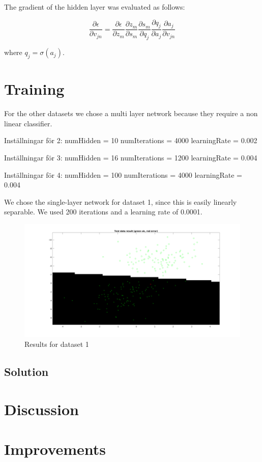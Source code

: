 \documentclass{article}
\begin{document}
The gradient of the hidden layer was evaluated as follows:

\begin{equation}
  \frac{\partial \epsilon}{\partial v_{jn}} =
  \frac{\partial \epsilon}{\partial z_m}
  \frac{\partial z_m}{\partial s_m}
  \frac{\partial s_m}{\partial q_j}
  \frac{\partial q_j}{\partial a_j}
  \frac{\partial a_j}{\partial v_{jn}}
\end{equation}

where $q_j = \sigma(a_j)$.

\section{Training}

For the other datasets we chose a multi layer network because they
require a non linear classifier.

Inställningar för 2:
numHidden = 10
numIterations = 4000
learningRate = 0.002

Inställningar för 3:
numHidden = 16
numIterations = 1200
learningRate = 0.004

Inställningar för 4:
numHidden = 100
numIterations = 4000
learningRate = 0.004

We chose the single-layer network for dataset 1, since this 
is easily linearly separable. We used 200 iterations and a learning rate of
0.0001.

\begin{figure}
    \includegraphics[width=13cm]{dataset1res.png}
    \caption{Results for dataset 1}
\end{figure}

\subsection{Solution}

\section{Discussion}

\section{Improvements}
\end{document}
